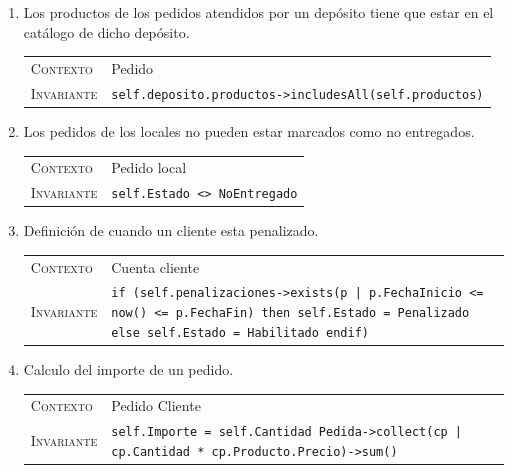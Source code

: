 \begin{enumerate}
    \item Los productos de los pedidos atendidos por un depósito tiene que
    estar en el catálogo de dicho depósito.

    \begin{center}
    \begin{tabular}{p{} p{}}
        \textsc{Contexto} & Pedido \\
        \textsc{Invariante} &
        \texttt{self.deposito.productos->includesAll(self.productos)} \\
    \end{tabular}
    \end{center}


    \item Los pedidos de los locales no pueden estar marcados como no
    entregados.

    \begin{center}
    \begin{tabular}{p{} p{}}
        \textsc{Contexto} & Pedido local \\
        \textsc{Invariante} & \texttt{self.Estado <>\ NoEntregado} \\
    \end{tabular}
    \end{center}
    
    \item Definición de cuando un cliente esta penalizado.

    \begin{center}
    \begin{tabular}{p{} p{}}
        \textsc{Contexto} & Cuenta cliente \\
        \textsc{Invariante} & \texttt{if (self.penalizaciones->exists(p | p.FechaInicio <= now() <= p.FechaFin) then self.Estado = Penalizado else self.Estado = Habilitado endif)} \\
    \end{tabular}
    \end{center}
    
    \item Calculo del importe de un pedido.

    \begin{center}
    \begin{tabular}{p{} p{}}
        \textsc{Contexto} & Pedido Cliente \\
        \textsc{Invariante} & \texttt{self.Importe = self.Cantidad\ Pedida->collect(cp | cp.Cantidad * cp.Producto.Precio)->sum()} \\
    \end{tabular}
    \end{center}
    

\end{enumerate}
